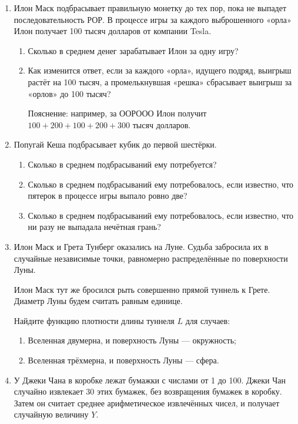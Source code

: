 \begin{enumerate}
  \item Илон Маск подбрасывает правильную монетку до тех пор, пока не выпадет последовательность
  РОР. В процессе игры за каждого выброшенного «орла» Илон получает 100 тысяч долларов от компании Tesla.
  
  \begin{enumerate}
    \item Сколько в среднем денег зарабатывает Илон за одну игру?
    \item Как изменится ответ, если за каждого «орла», идущего подряд, выигрыш растёт на 100 тысяч,
    а промелькнувшая «решка» сбрасывает выигрыш за «орлов» до 100 тысяч?
  
  Пояснение: например, за ООРООО Илон получит $100 + 200 + 100 + 200 + 300$ тысяч долларов.
  \end{enumerate}
  
  
  \item Попугай Кеша подбрасывает кубик до первой шестёрки. 
  
  \begin{enumerate}
    \item Сколько в среднем подбрасываний ему потребуется?
    \item Сколько в среднем подбрасываний ему потребовалось, если известно, что
    пятерок в процессе игры выпало ровно две?
    \item Сколько в среднем подбрасываний ему потребовалось, если известно, что
    ни разу не выпадала нечётная грань?
  \end{enumerate}
  
  \item Илон Маск и Грета Тунберг оказались на Луне. 
  Судьба забросила их в случайные независимые точки, равномерно распределённые по поверхности Луны. 
  
  Илон Маск тут же бросился рыть совершенно прямой туннель к
  Грете. Диаметр Луны будем считать равным единице.
  
  Найдите функцию плотности длины туннеля $L$ для случаев:
  
  \begin{enumerate}
    \item Вселенная двумерна, и поверхность Луны — окружность;
    \item Вселенная трёхмерна, и поверхность Луны — сфера.
  \end{enumerate}
  
  
  \item У Джеки Чана в коробке лежат бумажки с числами от 1 до 100. 
  Джеки Чан случайно извлекает 30 этих бумажек, без возвращения бумажек в коробку.
  Затем он считает среднее арифметическое извлечённых чисел, и получает случайную величину $Y$.
  

\end{enumerate}

